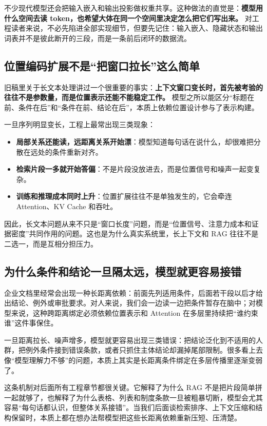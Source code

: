 不少现代模型还会把输入嵌入和输出投影做权重共享。这种做法的直觉是：\textbf{模型用什么空间去读 token，也希望大体在同一个空间里决定怎么把它们写出来。} 对工程读者来说，不必先陷进全部实现细节，但要先记住：输入嵌入、隐藏状态和输出词表并不是彼此断开的三段，而是一条前后闭环的数据流。

\subsection{位置编码扩展不是“把窗口拉长”这么简单}
旧稿里关于长文本处理讲过一个很重要的事实：\textbf{上下文窗口变长时，首先被考验的往往不是参数量，而是位置表示还能不能稳定工作。} 模型之所以能区分“标题在前、条件在后”和“条件在前、结论在后”，本质上依赖位置设计参与了表示构建。

一旦序列明显变长，工程上最常出现三类现象：
\begin{itemize}
  \item \textbf{局部关系还能读，远距离关系开始漂}：模型知道每句话在说什么，却很难把分散在远处的条件重新对齐。
  \item \textbf{检索片段一多就开始答偏}：不是片段没放进去，而是位置信号和噪声一起变复杂。
  \item \textbf{训练和推理成本同时上升}：位置扩展往往不是单独发生的，它会牵连 Attention、KV Cache 和吞吐。
\end{itemize}

因此，长文本问题从来不只是“窗口长度”问题，而是“位置信号、注意力成本和证据密度”共同作用的问题。这也是为什么真实系统里，长上下文和 RAG 往往不是二选一，而是互相分担压力。

\subsection{为什么条件和结论一旦隔太远，模型就更容易接错}
企业文档里经常会出现一种长距离依赖：前面先列适用条件，后面若干段以后才给出结论、例外或审批要求。对人来说，我们会一边读一边把条件暂存在脑中；对模型来说，这种跨距离绑定必须依赖位置表示和 Attention 在多层里持续把“谁约束谁”这件事保住。

一旦距离拉长、噪声增多，模型就更容易出现三类错误：把结论泛化到不适用的人群，把例外条件接到错误条款，或者只抓住主体结论却漏掉尾部限制。很多看上去像“模型理解力不够”的问题，本质上其实是长距离条件绑定在多层传播里逐渐变弱了。

这条机制对后面所有工程章节都很关键。它解释了为什么 RAG 不是把片段简单拼一起就够了，也解释了为什么表格、列表和制度条款一旦被粗暴切断，模型会尤其容易“每句话都认识，但整体关系接错”。当我们后面谈检索排序、上下文压缩和结构保留时，本质上都在想办法帮模型把这些长距离依赖重新压短、压清楚。


